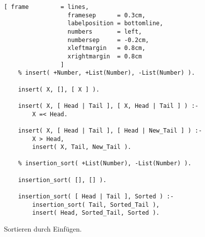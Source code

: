 \begin{figure}[!h]
  \centering
\begin{Verbatim}[ frame         = lines, 
                  framesep      = 0.3cm, 
                  labelposition = bottomline,
                  numbers       = left,
                  numbersep     = -0.2cm,
                  xleftmargin   = 0.8cm,
                  xrightmargin  = 0.8cm
                ]
    % insert( +Number, +List(Number), -List(Number) ).

    insert( X, [], [ X ] ). 

    insert( X, [ Head | Tail ], [ X, Head | Tail ] ) :-
        X =< Head.

    insert( X, [ Head | Tail ], [ Head | New_Tail ] ) :-
        X > Head,
        insert( X, Tail, New_Tail ).

    % insertion_sort( +List(Number), -List(Number) ).

    insertion_sort( [], [] ).

    insertion_sort( [ Head | Tail ], Sorted ) :-
        insertion_sort( Tail, Sorted_Tail ),
        insert( Head, Sorted_Tail, Sorted ).
\end{Verbatim}
\vspace*{-0.3cm}
  \caption{Sortieren durch Einf\"{u}gen.}
  \label{fig:insertion-sort}
\end{figure}


